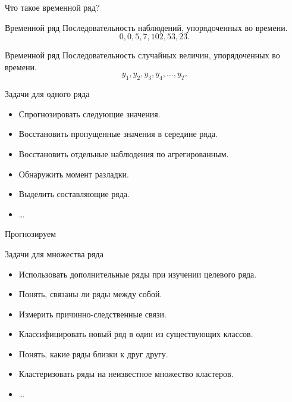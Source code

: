 \begin{frame}{Что такое временной ряд?}

\begin{block}{Временной ряд}
Последовательность наблюдений, упорядоченных во времени. 
\[
0, 0, 5, 7, 102, 53, 23. 
\]
\end{block}

\pause
\begin{block}{Временной ряд}
Последовательность случайных величин, упорядоченных во времени. 
\[
y_1, y_2, y_3, y_4, \ldots, y_T.
\]
\end{block}
  

\end{frame}


\begin{frame}{Задачи для одного ряда}

\begin{itemize}[<+->]
  \item Спрогнозировать следующие значения.
  \item Восстановить пропущенные значения в середине ряда.
  \item Восстановить отдельные наблюдения по агрегированным.
  \item Обнаружить момент разладки.
  \item Выделить составляющие ряда. 
  \item \ldots 
\end{itemize}

\end{frame}


\begin{frame}{Прогнозируем}

  
\end{frame}


\begin{frame}{Задачи для множества ряда}

  \begin{itemize}[<+->]
    \item Использовать дополнительные ряды при изучении целевого ряда.
    \item Понять, связаны ли ряды между собой.
    \item Измерить причинно-следственные связи.
    \item Классифицировать новый ряд в один из существующих классов.
    \item Понять, какие ряды близки к друг другу.
    \item Кластеризовать ряды на неизвестное множество кластеров.
    \item \ldots
  \end{itemize}
  
\end{frame}
  
